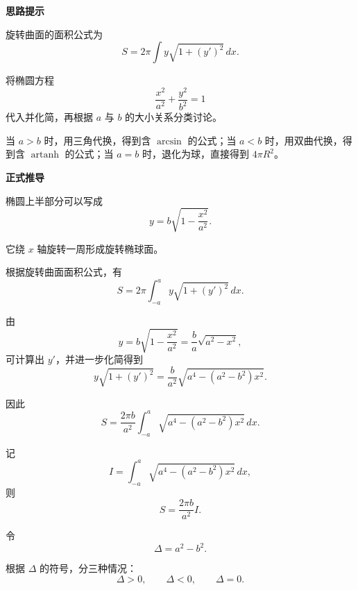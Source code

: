 \begin{proofbox}

	\textbf{\textcolor{CProof}{思路提示}}

	旋转曲面的面积公式为
	\[
		S
		=
		2\pi\int y\sqrt{1+(y')^{2}}\,dx.
	\]

	将椭圆方程
	\[
		\frac{x^{2}}{a^{2}}+\frac{y^{2}}{b^{2}}=1
	\]
	代入并化简，再根据 $a$ 与 $b$ 的大小关系分类讨论。

	当 $a>b$ 时，用三角代换，得到含 $\arcsin$ 的公式；当 $a<b$ 时，用双曲代换，得到含 $\operatorname{artanh}$ 的公式；当 $a=b$ 时，退化为球，直接得到 $4\pi R^{2}$。

	\medskip

	\textbf{\textcolor{CProof}{正式推导}}

	\begin{description}[style=nextline, leftmargin=2.8em, labelsep=0.5em, itemsep=0.55em]

		\item[\textbf{步骤一（建立积分）：}]
		      椭圆上半部分可以写成
		      \[
			      y
			      =
			      b\sqrt{1-\frac{x^{2}}{a^{2}}}.
		      \]

		      它绕 $x$ 轴旋转一周形成旋转椭球面。

		      根据旋转曲面面积公式，有
		      \[
			      S
			      =
			      2\pi\int_{-a}^{a}
			      y\sqrt{1+(y')^{2}}\,dx.
		      \]

		\item[\textbf{步骤二（化简被积函数）：}]
		      由
		      \[
			      y
			      =
			      b\sqrt{1-\frac{x^{2}}{a^{2}}}
			      =
			      \frac{b}{a}\sqrt{a^{2}-x^{2}},
		      \]
		      可计算出 $y'$，并进一步化简得到
		      \[
			      y\sqrt{1+(y')^{2}}
			      =
			      \frac{b}{a^{2}}
			      \sqrt{a^{4}-(a^{2}-b^{2})x^{2}}.
		      \]

		      因此
		      \[
			      S
			      =
			      \frac{2\pi b}{a^{2}}
			      \int_{-a}^{a}
			      \sqrt{a^{4}-(a^{2}-b^{2})x^{2}}\,dx.
		      \]

		      记
		      \[
			      I
			      =
			      \int_{-a}^{a}
			      \sqrt{a^{4}-(a^{2}-b^{2})x^{2}}\,dx,
		      \]
		      则
		      \[
			      S
			      =
			      \frac{2\pi b}{a^{2}}I.
		      \]

		\item[\textbf{步骤三（分类讨论）：}]
		      令
		      \[
			      \Delta=a^{2}-b^{2}.
		      \]

		      根据 $\Delta$ 的符号，分三种情况：
		      \[
			      \Delta>0,\qquad \Delta<0,\qquad \Delta=0.
		      \]


\end{description}
\end{proofbox}
